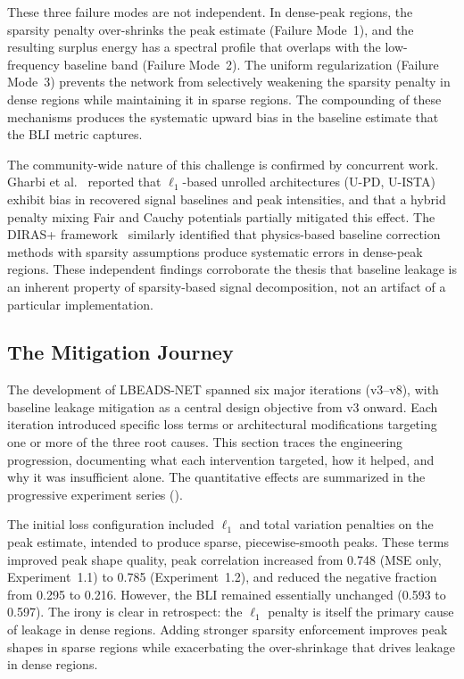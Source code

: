 These three failure modes are not independent. In dense-peak regions, the sparsity penalty over-shrinks the peak estimate (Failure Mode~1), and the resulting surplus energy has a spectral profile that overlaps with the low-frequency baseline band (Failure Mode~2). The uniform regularization (Failure Mode~3) prevents the network from selectively weakening the sparsity penalty in dense regions while maintaining it in sparse regions. The compounding of these mechanisms produces the systematic upward bias in the baseline estimate that the BLI metric captures.

The community-wide nature of this challenge is confirmed by concurrent work. Gharbi et al.~\cite{gharbi2024unrolled} reported that $\ell_1$-based unrolled architectures (U-PD, U-ISTA) exhibit bias in recovered signal baselines and peak intensities, and that a hybrid penalty mixing Fair and Cauchy potentials partially mitigated this effect. The DIRAS+ framework~\cite{diras2025} similarly identified that physics-based baseline correction methods with sparsity assumptions produce systematic errors in dense-peak regions. These independent findings corroborate the thesis that baseline leakage is an inherent property of sparsity-based signal decomposition, not an artifact of a particular implementation.


\subsection{The Mitigation Journey}
\label{sec:disc_leakage_journey}

The development of LBEADS-NET spanned six major iterations (v3--v8), with baseline leakage mitigation as a central design objective from v3 onward. Each iteration introduced specific loss terms or architectural modifications targeting one or more of the three root causes. This section traces the engineering progression, documenting what each intervention targeted, how it helped, and why it was insufficient alone. The quantitative effects are summarized in the progressive experiment series ().

The initial loss configuration included $\ell_1$ and total variation penalties on the peak estimate, intended to produce sparse, piecewise-smooth peaks. These terms improved peak shape quality, peak correlation increased from 0.748 (MSE only, Experiment~1.1) to 0.785 (Experiment~1.2), and reduced the negative fraction from 0.295 to 0.216. However, the BLI remained essentially unchanged (0.593 to 0.597). The irony is clear in retrospect: the $\ell_1$ penalty is itself the primary cause of leakage in dense regions. Adding stronger sparsity enforcement improves peak shapes in sparse regions while exacerbating the over-shrinkage that drives leakage in dense regions.

